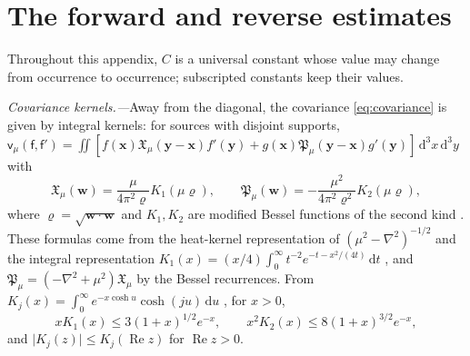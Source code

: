 \documentclass[aps,prl,reprint,longbibliography,raggedbottom]{revtex4-2}
\newcommand{\dd}{\,\mathrm d}
\newcommand{\abs}[1]{\lvert #1\rvert}
\DeclareMathOperator{\Rea}{Re}
\newcommand{\cov}{\mathsf v}
\newcommand{\sx}{\mathsf f}
\newcommand{\sy}{\mathsf f'}
\newcommand{\bx}{\mathbf x}
\newcommand{\by}{\mathbf y}
\begin{document}
\section{The forward and reverse estimates}\label{app:estimates}

Throughout this appendix, $C$ is a universal constant whose value may
change from occurrence to occurrence; subscripted constants keep their
values.

\emph{Covariance kernels.---}Away from the diagonal, the covariance
\eqref{eq:covariance} is given by integral kernels: for sources with
disjoint supports,
$\cov_\mu(\sx,\sy)=\iint[f(\bx)\mathfrak X_\mu(\by-\bx)f'(\by)
+g(\bx)\mathfrak P_\mu({\by-\bx})g'(\by)]\dd^3x\dd^3y$ with
\begin{equation}
\mathfrak X_\mu(\mathbf w)=\frac{\mu}{4\pi^2\varrho}K_1(\mu\varrho),\qquad
\mathfrak P_\mu(\mathbf w)=-\frac{\mu^2}{4\pi^2\varrho^2}K_2(\mu\varrho),
\label{eq:kernels}
\end{equation}
where $\varrho=\sqrt{\mathbf w\cdot\mathbf w}$ and $K_1,K_2$ are
modified Bessel functions of the second kind \cite{DLMF}. These formulas come from the
heat-kernel representation of $(\mu^2-\nabla^2)^{-1/2}$ and the integral
representation $K_1(x)=(x/4)\int_0^\infty t^{-2}e^{-t-x^2/(4t)}\dd t$
\cite[Eq.~10.32.10]{DLMF}, and $\mathfrak P_\mu=(-\nabla^2+\mu^2)\mathfrak X_\mu$
by the Bessel recurrences. From $K_j(x)=\int_0^\infty e^{-x\cosh u}\cosh(ju)\dd u$
\cite[Eq.~10.32.9]{DLMF}, for $x>0$,
\begin{equation}
xK_1(x)\le3(1+x)^{1/2}e^{-x},\qquad x^2K_2(x)\le8(1+x)^{3/2}e^{-x},
\label{eq:Bessel-scaled}
\end{equation}
and $\abs{K_j(z)}\le K_j(\Rea z)$ for $\Rea z>0$.
\end{document}
